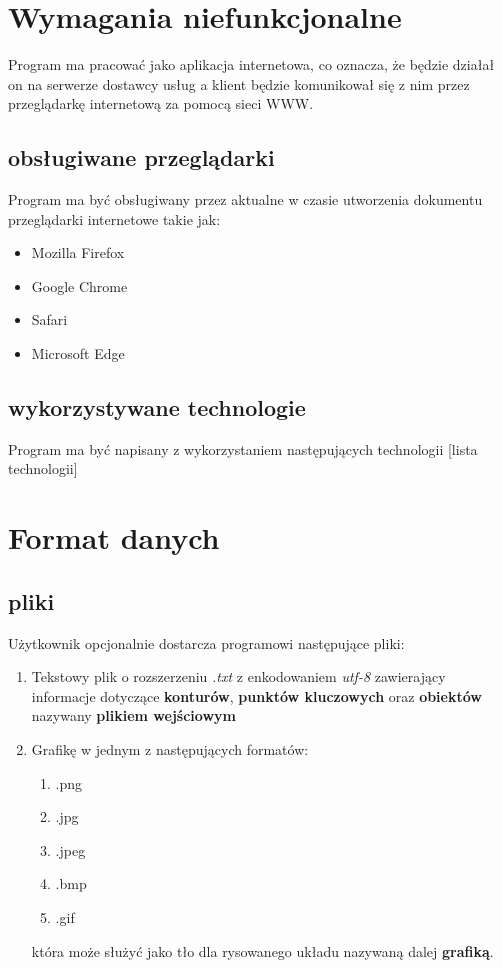 \documentclass[hidelinks,10pt,a4paper]{article}
\newcommand\tab[1][0.5cm]{\hspace*{#1}}
\begin{document}
\section{Wymagania niefunkcjonalne}
\tab Program ma pracować jako aplikacja internetowa, co oznacza, że będzie działał on na serwerze dostawcy usług a klient będzie komunikował się z nim przez przeglądarkę internetową za pomocą sieci WWW.
\subsection{obsługiwane przeglądarki}
Program ma być obsługiwany przez aktualne w czasie utworzenia dokumentu  przeglądarki internetowe takie jak:
\begin{itemize}
\item Mozilla Firefox
\item Google Chrome
\item Safari
\item Microsoft Edge
\end{itemize}  
\subsection{wykorzystywane technologie}
Program ma być napisany z wykorzystaniem następujących technologii [lista technologii]




\section{Format danych}
\label{sec:daneWej}

\subsection{pliki}
Użytkownik opcjonalnie dostarcza programowi następujące pliki:
\begin{enumerate}
\item Tekstowy plik o rozszerzeniu \textit{.txt} z enkodowaniem \textit{utf-8} zawierający informacje dotyczące \textbf{konturów}, \textbf{punktów kluczowych} oraz \textbf{obiektów} nazywany \textbf{plikiem wejściowym}
\item Grafikę w jednym z następujących formatów: 
\begin{enumerate}
\item .png
\item .jpg
\item .jpeg
\item .bmp
\item .gif
\end{enumerate}
która może służyć jako tło dla rysowanego układu nazywaną dalej   \textbf{grafiką}.
\end{enumerate}
\end{document}
